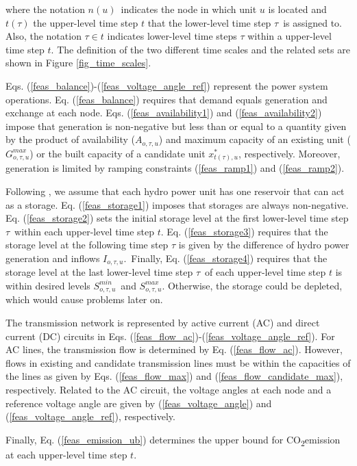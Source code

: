 \documentclass[final]{IEEEtran}
\newcommand{\COtwo}{CO\textsubscript{2}\;}
\begin{document}
where the notation $n(u)$ indicates the node in which unit $u$ is located and $t(\tau)$ the upper-level time step $t$ that the lower-level time step $\tau$ is assigned to. Also, the notation $\tau \in t$ indicates lower-level time steps $\tau$ within a upper-level time step $t$. The definition of the two different time scales and the related sets are shown in Figure \ref{fig_time_scales}.

Eqs. (\ref{feas_balance})-(\ref{feas_voltage_angle_ref}) represent the power system operations. Eq. (\ref{feas_balance}) requires that demand equals generation and exchange at each node. Eqs. (\ref{feas_availability1}) and (\ref{feas_availability2}) impose that generation is non-negative but less than or equal to a quantity given by the product of availability ($A_{o, \tau, u}$) and maximum capacity of an existing unit ($G_{o, \tau, u}^{max}$) or the built capacity of a candidate unit $x_{t(\tau), u}^*$, respectively. Moreover, generation is limited by ramping constraints (\ref{feas_ramp1}) and (\ref{feas_ramp2}).

Following \cite{Debia}, we assume that each hydro power unit has one reservoir that can act as a storage. Eq. (\ref{feas_storage1}) imposes that storages are always non-negative. Eq. (\ref{feas_storage2}) sets the initial storage level at the first lower-level time step $\tau$ within each upper-level time step $t$. Eq. (\ref{feas_storage3}) requires that the storage level at the following time step $\tau$ is given by the difference of hydro power generation and inflows $I_{o, \tau, u}$. Finally, Eq. (\ref{feas_storage4}) requires that the storage level at the last lower-level time step $\tau$ of each upper-level time step $t$ is within desired levels $S^{min}_{o, \tau, u}$ and $S^{max}_{o, \tau, u}$. Otherwise, the storage could be depleted, which would cause problems later on.

The transmission network is represented by active current (AC) and direct current (DC) circuits in Eqs. (\ref{feas_flow_ac})-(\ref{feas_voltage_angle_ref}). For AC lines, the transmission flow is determined by Eq. (\ref{feas_flow_ac}). However, flows in existing and candidate transmission lines must be within the capacities of the lines as given by Eqs. (\ref{feas_flow_max}) and (\ref{feas_flow_candidate_max}), respectively. Related to the AC circuit, the voltage angles at each node and a reference voltage angle are given by (\ref{feas_voltage_angle}) and (\ref{feas_voltage_angle_ref}), respectively.

Finally, Eq. (\ref{feas_emission_ub}) determines the upper bound for \COtwo emission at each upper-level time step $t$.
\end{document}
